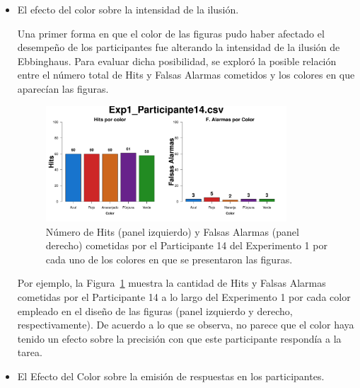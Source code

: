\begin{itemize}
	\item El efecto del color sobre la intensidad de la ilusión.

Una primer forma en que el color de las figuras pudo haber afectado el desempeño de los participantes fue alterando la intensidad de la ilusión de Ebbinghaus. Para evaluar dicha posibilidad, se exploró la posible relación entre el número total de Hits y Falsas Alarmas cometidos y los colores en que aparecían las figuras.\\

\begin{figure}[th]
\centering
\includegraphics[width=0.85\textwidth]{Figures/Color_Exp1_P14}
\caption[Explorando datos individuales (ejemplo): Relación entre los Hits y las Falsas Alarmas registradas y el color de las figuras]{Número de Hits (panel izquierdo) y Falsas Alarmas (panel derecho) cometidas por el Participante 14 del Experimento 1 por cada uno de los colores en que se presentaron las figuras.}
\label{fig:Color_E1_P14}
\end{figure}

Por ejemplo, la Figura~\ref{fig:Color_E1_P14} muestra la cantidad de Hits y Falsas Alarmas cometidas por el Participante 14 a lo largo del Experimento 1 por cada color empleado en el diseño de las figuras (panel izquierdo y derecho, respectivamente). De acuerdo a lo que se observa, no parece que el color haya tenido un efecto sobre la precisión con que este participante respondía a la tarea.\\


	\item El Efecto del Color sobre la emisión de respuestas en los participantes.


\end{itemize}
